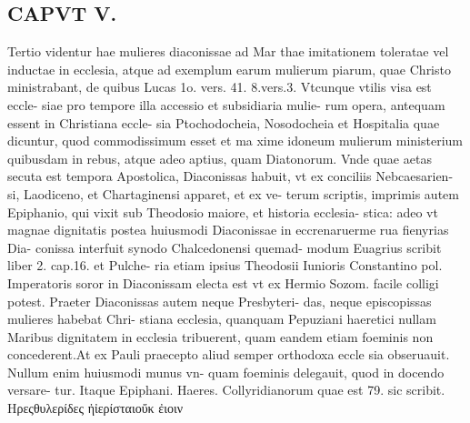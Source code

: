 \documentclass{article}
\begin{document}
\begin{pages}
\section*{CAPVT  V. }  \pend\pstart Tertio videntur hae mulieres diaconissae ad Mar thae imitationem toleratae vel inductae in ecclesia, atque ad exemplum earum mulierum piarum, quae Christo ministrabant, de quibus Lucas 1o. vers. 41. 8.vers.3. Vtcunque vtilis visa est eccle- siae pro tempore illa accessio et subsidiaria mulie- rum opera, antequam essent in Christiana eccle- sia Ptochodocheia, Nosodocheia et Hospitalia quae dicuntur, quod commodissimum esset et ma xime idoneum mulierum ministerium quibusdam in rebus, atque adeo aptius, quam Diatonorum.  \pend\pstart Vnde quae aetas secuta est tempora Apostolica, Diaconissas habuit, vt ex conciliis Nebcaesarien- si, Laodiceno, et Chartaginensi apparet, et ex ve- terum scriptis, imprimis autem Epiphanio, qui vixit sub Theodosio maiore, et historia ecclesia- stica: adeo vt magnae dignitatis postea huiusmodi Diaconissae in eccrenaruerme rua fienyrias Dia- conissa interfuit synodo Chalcedonensi quemad- modum Euagrius scribit liber 2. cap.16. et Pulche- ria etiam ipsius Theodosii Iunioris Constantino pol. Imperatoris soror in Diaconissam electa est vt ex Hermio Sozom. facile colligi potest.  \pend\pstart Praeter Diaconissas autem neque Presbyteri- das, neque episcopissas mulieres habebat Chri- stiana ecclesia, quanquam Pepuziani haeretici nullam Maribus dignitatem in ecclesia tribuerent, quam eandem etiam foeminis non concederent.At ex Pauli praecepto aliud semper orthodoxa eccle sia obseruauit. Nullum enim huiusmodi munus vn- quam foeminis delegauit, quod in docendo versare- tur. Itaque Epiphani. Haeres. Collyridianorum quae est 79. sic scribit. Hρεςθυλερίδες ἠἰερίσταιοὔκ ἐιοιν  \pend

\end{pages}
\end{document}
